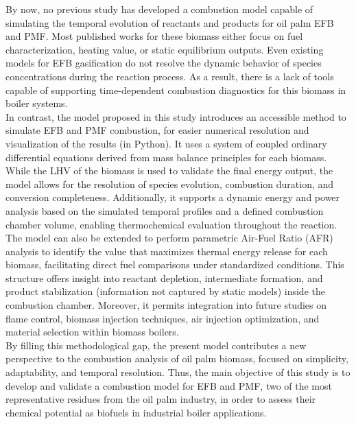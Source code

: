 \documentclass[preprint,12pt]{elsarticle}
\begin{document}
By now, no previous study has developed a combustion model capable of simulating the temporal evolution of reactants and products for oil palm EFB and PMF. Most published works for these biomass either focus on fuel characterization, heating value, or static equilibrium outputs. Even existing models for EFB gasification \cite{OilPalmRachisGasification, Ramos2017} do not resolve the dynamic behavior of species concentrations during the reaction process. As a result, there is a lack of tools capable of supporting time-dependent combustion diagnostics for this biomass in boiler systems.\\

In contrast, the model proposed in this study introduces an accessible method to simulate EFB and PMF combustion, for easier numerical resolution and visualization of the results (in Python). It uses a system of coupled ordinary differential equations derived from mass balance principles for each biomass. While the LHV of the biomass is used to validate the final energy output, the model allows for the resolution of species evolution, combustion duration, and conversion completeness. Additionally, it supports a dynamic energy and power analysis based on the simulated temporal profiles and a defined combustion chamber volume, enabling thermochemical evaluation throughout the reaction. The model can also be extended to perform parametric Air-Fuel Ratio (AFR) analysis to identify the value that maximizes thermal energy release for each biomass, facilitating direct fuel comparisons under standardized conditions. This structure offers insight into reactant depletion, intermediate formation, and product stabilization (information not captured by static models) inside the combustion chamber. Moreover, it permits integration into future studies on flame control, biomass injection techniques, air injection optimization, and material selection within biomass boilers.\\

By filling this methodological gap, the present model contributes a new perspective to the combustion analysis of oil palm biomass, focused on simplicity, adaptability, and temporal resolution. Thus, the main objective of this study is to develop and validate a combustion model for EFB and PMF, two of the most representative residues from the oil palm industry, in order to assess their chemical potential as biofuels in industrial boiler applications.\\
\end{document}

